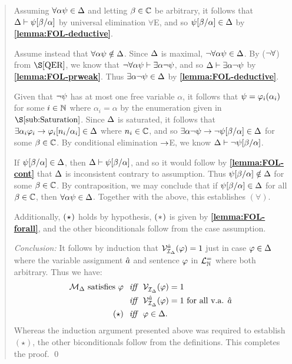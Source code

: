 \begin{quote}
  Assuming $\forall \alpha\psi \in \Delta$ and letting $\beta \in \mathbb{C}$ be arbitrary, it follows that $\Delta \vdash \psi[\beta/\alpha]$ by universal elimination $\forall$E, and so $\psi[\beta/\alpha] \in \Delta$ by \textbf{\ref{lemma:FOL-deductive}}. 

  Assume instead that $\forall \alpha\psi \notin \Delta$.
  Since $\Delta$ is maximal, $\neg\forall \alpha\psi \in \Delta$.
  By ($\neg\forall$) from $\S\ref{QER}$, we know that $\neg\forall \alpha\psi \vdash \exists \alpha\neg\psi$, and so $\Delta \vdash \exists \alpha\neg\psi$ by \textbf{\ref{lemma:FOL-prweak}}.
  Thus $\exists \alpha\neg\psi \in \Delta$ by \textbf{\ref{lemma:FOL-deductive}}.

  Given that $\neg\psi$ has at most one free variable $\alpha$, it follows that $\psi=\varphi_i(\alpha_i)$ for some $i\in\mathbb{N}$ where $\alpha_i=\alpha$ by the enumeration given in $\S\ref{sub:Saturation}$.
  Since $\Delta$ is saturated, it follows that $\exists \alpha_i \varphi_i \rightarrow \varphi_i[n_i/\alpha_i] \in \Delta$ where $n_i\in\mathbb{C}$, and so $\exists \alpha\neg\psi \rightarrow \neg\psi[\beta/\alpha] \in  \Delta$ for some $\beta \in \mathbb{C}$.
  By conditional elimination $\rightarrow$E, we know $\Delta \vdash \neg\psi[\beta/\alpha]$.

  If $\psi[\beta/\alpha] \in \Delta$, then $\Delta \vdash \psi[\beta/\alpha]$, and so it would follow by \textbf{\ref{lemma:FOL-cont}} that $\Delta$ is inconsistent contrary to assumption. 
  Thus $\psi[\beta/\alpha] \notin \Delta$ for some $\beta \in \mathbb{C}$.
  By contraposition, we may conclude that if $\psi[\beta/\alpha] \in \Delta$ for all $\beta \in \mathbb{C}$, then $\forall \alpha\psi \in \Delta$.
  Together with the above, this establishes $(\forall)$. 

  Additionally, $(\hspace{.7pt}\star\hspace{.7pt})$ holds by hypothesis, $(\hspace{.7pt}\ast\hspace{.7pt})$ is given by \textbf{\ref{lemma:FOL-forall}}, and the other biconditionals follow from the case assumption.

  \textit{Conclusion:}
  It follows by induction that $\mathcal{V}_{\mathcal{I}_{\Delta}}^{\hat{a}}(\varphi)=1$ just in case $\varphi\in\Delta$ where the variable assignment $\hat{a}$ and sentence $\varphi$ in $\mathcal{L}^{=}_{\mathbb{N}}$ where both arbitrary. 
  Thus we have:
  \begin{align*}
    \mathcal{M}_{\Delta} \text{ satisfies } \varphi &\textit{ ~iff~ } \mathcal{V}_{\mathcal{I}_{\Delta}}^{}(\varphi)=1\\
      &\textit{ ~iff~ } \mathcal{V}_{\mathcal{I}_{\Delta}}^{\hat{a}}(\varphi)=1 \text{ for all v.a. } \hat{a}\\
      (\star) &\textit{ ~iff~ } \varphi\in\Delta.
  \end{align*}
  Whereas the induction argument presented above was required to establish $(\star)$, the other biconditionals follow from the definitions.
  This completes the proof.
  \qed
\end{quote}

